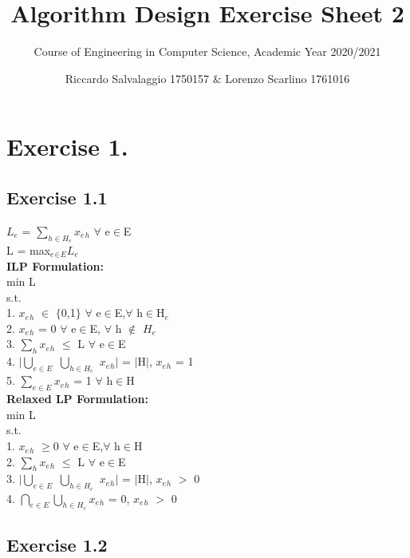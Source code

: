 \documentclass[11pt]{scrartcl}
\title{Algorithm Design Exercise Sheet 2}
\author{Riccardo Salvalaggio 1750157 $\&$ Lorenzo Scarlino 1761016}
\subtitle{Course of Engineering in Computer Science, Academic Year 2020/2021}
\begin{document}
\maketitle

\begin{abstract}

\end{abstract}
\newpage
\section{Exercise 1.}
\subsection{Exercise 1.1}
$L_e$ = $\sum_{h \in H_e}x_e$$_h$ $\forall$ e$\in$E\\ 
L = max$_e$$_\in$$_E$$L_e$\\
\textbf{ILP Formulation:}\\
min L\\
s.t.\\
1. $x_e$$_h$ $\in$ $\{$0,1$\}$ $\forall$ e$\in$E,$\forall$ h$\in$H$_e$\\
2. $x_e$$_h$ = 0 $\forall$ e$\in$E, $\forall$ h $\notin$ $H_e$\\
3. $\sum_{h}x_e$$_h$ $\leq$ L $\forall$ e$\in$E\\
4. $|$$\bigcup_{e \in E}$ $\bigcup_{h \in H_e}$ $x_e$$_h$$|$ = $|$H$|$, $x_e$$_h$ = 1\\
5. $\sum_{e \in E} x_e$$_h$ = 1 $\forall$ h$\in$H\\
\textbf{Relaxed LP Formulation:}\\
min L\\
s.t.\\
1. $x_e$$_h$ $\geq 0$ $\forall$ e$\in$E,$\forall$ h$\in$H\\
2. $\sum_{h}x_e$$_h$ $\leq$ L $\forall$ e$\in$E\\
3. $|$$\bigcup_{e \in E}$ $\bigcup_{h \in H_e}$ $x_e$$_h$$|$ = $|$H$|$, $x_e$$_h$ $>$ 0\\
4. $\bigcap_{e \in E}$$\bigcup_{h \in H_e} x_e$$_h$ = 0, $x_e$$_h$ $>$ 0\\
\subsection{Exercise 1.2}
\vspace{-0.3cm}
\newpage
\end{document}
